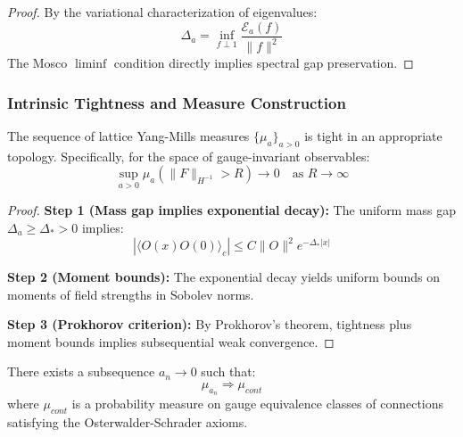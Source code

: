 \begin{proof}
By the variational characterization of eigenvalues:
\begin{equation}
\Delta_a = \inf_{f \perp 1} \frac{\mathcal{E}_a(f)}{\|f\|^2}
\end{equation}
The Mosco $\liminf$ condition directly implies spectral gap preservation.
\end{proof}

\subsubsection{Intrinsic Tightness and Measure Construction}

\begin{theorem}
\label{thm:tightness}
The sequence of lattice Yang-Mills measures $\{\mu_a\}_{a > 0}$ is tight in an appropriate topology. Specifically, for the space of gauge-invariant observables:
\begin{equation}
\sup_{a > 0} \mu_a\left(\|F\|_{H^{-1}} > R\right) \to 0 \quad \text{as } R \to \infty
\end{equation}
\end{theorem}

\begin{proof}
\textbf{Step 1 (Mass gap implies exponential decay):}
The uniform mass gap $\Delta_a \geq \Delta_* > 0$ implies:
\begin{equation}
|\langle O(x) O(0) \rangle_c| \leq C \|O\|^2 e^{-\Delta_* |x|}
\end{equation}

\textbf{Step 2 (Moment bounds):}
The exponential decay yields uniform bounds on moments of field strengths in Sobolev norms.

\textbf{Step 3 (Prokhorov criterion):}
By Prokhorov's theorem, tightness plus moment bounds implies subsequential weak convergence.
\end{proof}

\begin{theorem}
\label{thm:continuum_existence}
There exists a subsequence $a_n \to 0$ such that:
\begin{equation}
\mu_{a_n} \Rightarrow \mu_{cont}
\end{equation}
where $\mu_{cont}$ is a probability measure on gauge equivalence classes of connections satisfying the Osterwalder-Schrader axioms.
\end{theorem}


